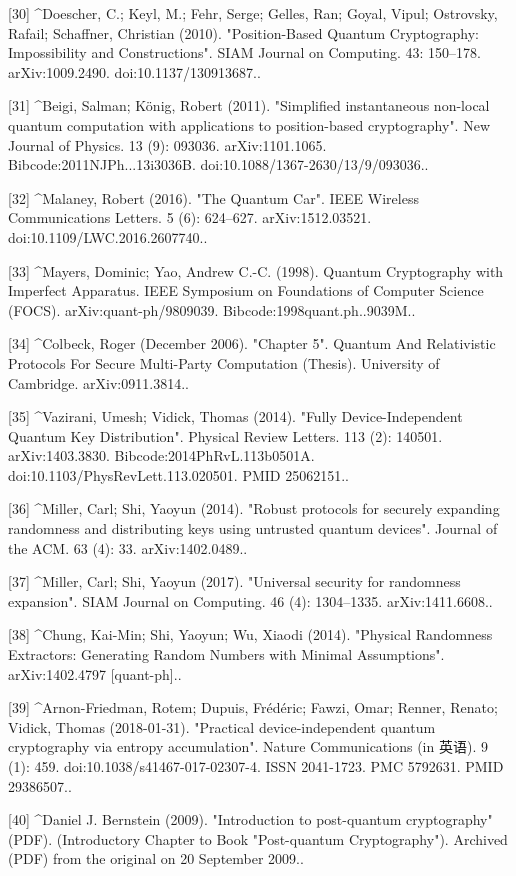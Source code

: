 [30]
^Doescher, C.; Keyl, M.; Fehr, Serge; Gelles, Ran; Goyal, Vipul; Ostrovsky, Rafail; Schaffner, Christian (2010). "Position-Based Quantum Cryptography: Impossibility and Constructions". SIAM Journal on Computing. 43: 150–178. arXiv:1009.2490. doi:10.1137/130913687..

[31]
^Beigi, Salman; König, Robert (2011). "Simplified instantaneous non-local quantum computation with applications to position-based cryptography". New Journal of Physics. 13 (9): 093036. arXiv:1101.1065. Bibcode:2011NJPh...13i3036B. doi:10.1088/1367-2630/13/9/093036..

[32]
^Malaney, Robert (2016). "The Quantum Car". IEEE Wireless Communications Letters. 5 (6): 624–627. arXiv:1512.03521. doi:10.1109/LWC.2016.2607740..

[33]
^Mayers, Dominic; Yao, Andrew C.-C. (1998). Quantum Cryptography with Imperfect Apparatus. IEEE Symposium on Foundations of Computer Science (FOCS). arXiv:quant-ph/9809039. Bibcode:1998quant.ph..9039M..

[34]
^Colbeck, Roger (December 2006). "Chapter 5". Quantum And Relativistic Protocols For Secure Multi-Party Computation (Thesis). University of Cambridge. arXiv:0911.3814..

[35]
^Vazirani, Umesh; Vidick, Thomas (2014). "Fully Device-Independent Quantum Key Distribution". Physical Review Letters. 113 (2): 140501. arXiv:1403.3830. Bibcode:2014PhRvL.113b0501A. doi:10.1103/PhysRevLett.113.020501. PMID 25062151..

[36]
^Miller, Carl; Shi, Yaoyun (2014). "Robust protocols for securely expanding randomness and distributing keys using untrusted quantum devices". Journal of the ACM. 63 (4): 33. arXiv:1402.0489..

[37]
^Miller, Carl; Shi, Yaoyun (2017). "Universal security for randomness expansion". SIAM Journal on Computing. 46 (4): 1304–1335. arXiv:1411.6608..

[38]
^Chung, Kai-Min; Shi, Yaoyun; Wu, Xiaodi (2014). "Physical Randomness Extractors: Generating Random Numbers with Minimal Assumptions". arXiv:1402.4797 [quant-ph]..

[39]
^Arnon-Friedman, Rotem; Dupuis, Frédéric; Fawzi, Omar; Renner, Renato; Vidick, Thomas (2018-01-31). "Practical device-independent quantum cryptography via entropy accumulation". Nature Communications (in 英语). 9 (1): 459. doi:10.1038/s41467-017-02307-4. ISSN 2041-1723. PMC 5792631. PMID 29386507..

[40]
^Daniel J. Bernstein (2009). "Introduction to post-quantum cryptography" (PDF). (Introductory Chapter to Book "Post-quantum Cryptography"). Archived (PDF) from the original on 20 September 2009..

